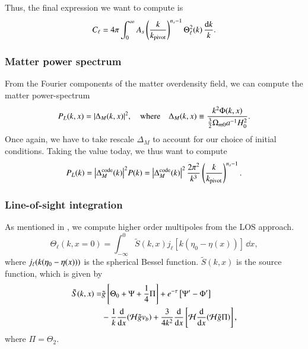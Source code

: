 Thus, the final expression we want to compute is 
\begin{equation} \label{eq:M4:theory:CMB_power_spectrum}
    C_\ell = 4\pi \int_0^\infty A_s \left( \frac{k}{k_\mathrm{pivot}} \right)^{n_s-1} \Theta_\ell^2(k) \, \frac{\dd k}{k}.
\end{equation}

\subsubsection{Matter power spectrum} \label{sssec:M4:theory:matter_power_spectrum}
From the Fourier components of the matter overdensity field, we can compute the matter power-spectrum
\begin{equation} \label{eq:M4:theory:MatterPS_of_x_k}
    P_L(k,x) = \abs{\Delta_M(k,x)}^2,\quad \text{where}\quad \Delta_M(k,x) \equiv \frac{k^2 \Phi(k,x)}{\frac{3}{2}\Omega_{m0} a^{-1} H_0^2}.
\end{equation}
Once again, we have to take rescale $\Delta_M$ to account for our choice of initial conditions. Taking the value today, we thus want to compute 
\begin{equation} \label{eq:M4:theory:MatterPS_code_today}
    P_L(k) = \abs{\Delta_M^\mathrm{code}(k)}^2 P(k) = \abs{\Delta_M^\mathrm{code}(k)}^2\, \frac{2\pi^2}{k^3}\left( \frac{k}{k_\mathrm{pivot}} \right)^{n_s-1}.
\end{equation}

\subsubsection{Line-of-sight integration}\label{sssec:M4:theory:line_of_sight_integration}
As mentioned in , we compute higher order multipoles from the LOS approach. 
\begin{equation} \label{eq:M4:theory:Theta_ell_LOS_integration}
    \Theta_\ell(k,x=0) = \int_{-\infty}^0 \tilde{S}(k,x) j_\ell [k(\eta_0 - \eta(x))]\,\dd x, 
\end{equation}
where $j_\ell(k(\eta_0-\eta(x)))$ is the spherical Bessel function. $\tilde{S}(k,x)$ is the source function, which is given by 
\begin{equation} \label{eq:M4:theory:source_function_LOS}
    \begin{split}
        \tilde{S}(k,x) =& \tilde{g} \left[ \Theta_0 + \Psi + \frac{1}{4} \Pi \right] + e^{-\tau}\left[ \Psi' - \Phi' \right] \\
        & - \frac{1}{k}\dv{x}(\mathcal{H} \tilde{g} v_b) + \frac{3}{4k^2}\dv{x}\left[ \mathcal{H} \dv{x}(\mathcal{H}\tilde{g}\Pi) \right],
    \end{split}
\end{equation}
where $\Pi=\Theta_2$.

